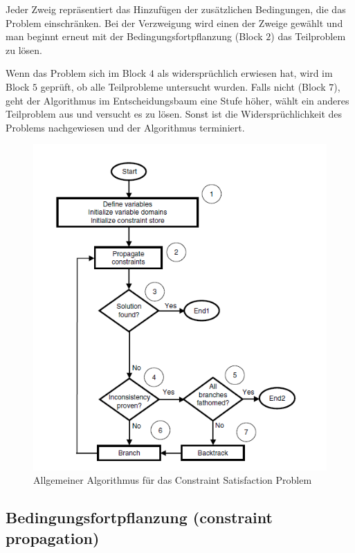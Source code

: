Jeder Zweig repräsentiert das Hinzufügen der zusätzlichen Bedingungen, die das Problem einschränken. Bei der Verzweigung wird einen der Zweige gewählt und man beginnt erneut mit der Bedingungsfortpflanzung (Block $2$) das Teilproblem zu lösen.

Wenn das Problem sich im Block $4$ als widersprüchlich erwiesen hat, wird im Block $5$ geprüft, ob alle Teilprobleme untersucht wurden. Falls nicht (Block $7$), geht der Algorithmus im Entscheidungsbaum eine Stufe höher, wählt ein anderes Teilproblem aus und versucht es zu lösen. Sonst ist die Widersprüchlichkeit des Problems nachgewiesen und der Algorithmus terminiert.

\begin{figure}[h]
	\centering
	\includegraphics[scale=0.9]{fig/CSPalgorithm.png}
	\caption{Allgemeiner Algorithmus für das Constraint Satisfaction Problem }
	\label{fig:CSPalgorithm}
\end{figure}

\FloatBarrier

\subsection{Bedingungsfortpflanzung (constraint propagation)}

